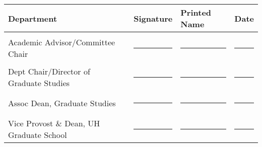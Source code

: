 \documentclass[12pt]{article}
\begin{document}
\vspace{0.5cm}

\begin{tabular}{llll}
Department & Signature & Printed Name & Date \\
\hline
\\
Academic Advisor/Committee Chair & \rule{4cm}{0.4pt} & \rule{4cm}{0.4pt} & \rule{2.5cm}{0.4pt} \\
\\
Dept Chair/Director of Graduate Studies & \rule{4cm}{0.4pt} & \rule{4cm}{0.4pt} & \rule{2.5cm}{0.4pt} \\
\\
Assoc Dean, Graduate Studies & \rule{4cm}{0.4pt} & \rule{4cm}{0.4pt} & \rule{2.5cm}{0.4pt} \\
\\
Vice Provost \& Dean, UH Graduate School & \rule{4cm}{0.4pt} & \rule{4cm}{0.4pt} & \rule{2.5cm}{0.4pt} \\
\end{tabular}

\label{LastPage}
\end{document}
